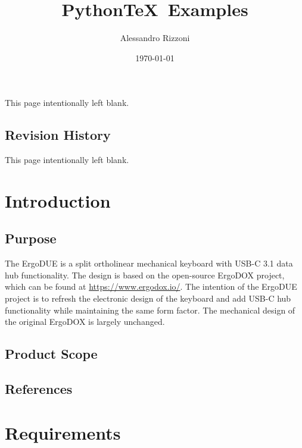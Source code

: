\documentclass[10pt]{report}
\newcommand{\theauthor}{Alessandro Rizzoni}
\newcommand{\thedoctitle}{Python\TeX\ Examples}
\newenvironment{revisionhistory}
    {\setcounter{secnumdepth}{0}}
    {\setcounter{secnumdepth}{2}}
\newcommand{\blankpage}{
        \vspace*{\fill}
            \hfill This page intentionally left blank. \hfill
        \vspace*{\fill}
}
\begin{document}
\author{\sffamily \theauthor}
\title{\sffamily \thedoctitle}
\date{\sffamily \today}
\maketitle

\tableofcontents

\pagebreak

\blankpage

\pagebreak

\begin{revisionhistory}

\section{Revision History}

\end{revisionhistory}

\pagebreak

\blankpage

\pagebreak

\chapter{Introduction}

\section{Purpose}

The ErgoDUE is a split ortholinear mechanical keyboard with USB-C 3.1 data hub functionality. The design is based on the open-source ErgoDOX project, which can be found at \url{https://www.ergodox.io/}. The intention of the ErgoDUE project is to refresh the electronic design of the keyboard and add USB-C hub functionality while maintaining the same form factor. The mechanical design of the original ErgoDOX is largely unchanged. 

\section{Product Scope}

\section{References}

\chapter{Requirements}
\end{document}
